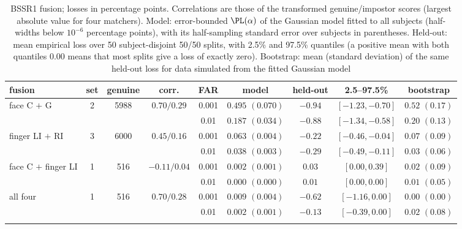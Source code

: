 \begin{table}[t]
\caption{BSSR1 fusion; losses in percentage points. Correlations are those of the transformed genuine/impostor scores (largest absolute value for four matchers). Model: error-bounded $\PL(\alpha)$ of the Gaussian model fitted to all subjects (half-widths below $10^{-6}$ percentage points), with its half-sampling standard error over subjects in parentheses. Held-out: mean empirical loss over 50 subject-disjoint 50/50 splits, with 2.5\% and 97.5\% quantiles (a positive mean with both quantiles 0.00 means that most splits give a loss of exactly zero). Bootstrap: mean (standard deviation) of the same held-out loss for data simulated from the fitted Gaussian model}\label{tab:bssr1}
\footnotesize\setlength{\tabcolsep}{2pt}
\begin{tabular*}{\textwidth}{@{\extracolsep\fill}lcccccccc@{}}
\toprule
fusion & set & genuine & corr. & FAR & model & held-out & 2.5--97.5\% & bootstrap\\
\midrule
face C $+$ G & 2 & 5988 & $0.70/0.29$ & 0.001 & $0.495$ $(0.070)$ & $-0.94$ & $[-1.23, -0.70]$ & $0.52$ $(0.17)$\\
 & & &  & 0.01 & $0.187$ $(0.034)$ & $-0.88$ & $[-1.34, -0.58]$ & $0.20$ $(0.13)$\\
\midrule
finger LI $+$ RI & 3 & 6000 & $0.45/0.16$ & 0.001 & $0.063$ $(0.004)$ & $-0.22$ & $[-0.46, -0.04]$ & $0.07$ $(0.09)$\\
 & & &  & 0.01 & $0.038$ $(0.003)$ & $-0.29$ & $[-0.49, -0.11]$ & $0.03$ $(0.06)$\\
\midrule
face C $+$ finger LI & 1 & 516 & $-0.11/0.04$ & 0.001 & $0.002$ $(0.001)$ & $0.03$ & $[0.00, 0.39]$ & $0.02$ $(0.09)$\\
 & & &  & 0.01 & $0.000$ $(0.000)$ & $0.01$ & $[0.00, 0.00]$ & $0.01$ $(0.05)$\\
\midrule
all four & 1 & 516 & $0.70/0.28$ & 0.001 & $0.009$ $(0.004)$ & $-0.62$ & $[-1.16, 0.00]$ & $0.00$ $(0.00)$\\
 & & &  & 0.01 & $0.002$ $(0.001)$ & $-0.13$ & $[-0.39, 0.00]$ & $0.02$ $(0.08)$\\
\botrule
\end{tabular*}
\end{table}
